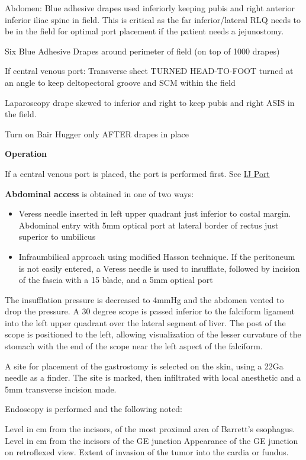 \documentclass[
  letterpaper,
]{scrbook}
\providecommand{\tightlist}{%
  \setlength{\itemsep}{0pt}\setlength{\parskip}{0pt}}
\begin{document}
Abdomen: Blue adhesive drapes used inferiorly keeping pubis and right
anterior inferior iliac spine in field. This is critical as the far
inferior/lateral RLQ needs to be in the field for optimal port placement
if the patient needs a jejunostomy.

Six Blue Adhesive Drapes around perimeter of field (on top of 1000
drapes)

If central venous port: Transverse sheet TURNED HEAD-TO-FOOT turned at
an angle to keep deltopectoral groove and SCM within the field

Laparoscopy drape skewed to inferior and right to keep pubis and right
ASIS in the field.

Turn on Bair Hugger only AFTER drapes in place

\textbf{Operation}

If a central venous port is placed, the port is performed first. See
\hyperref[cv_port_salo]{IJ Port}

\textbf{Abdominal access} is obtained in one of two ways:

\begin{itemize}
\tightlist
\item
  Veress needle inserted in left upper quadrant just inferior to costal
  margin. Abdominal entry with 5mm optical port at lateral border of
  rectus just superior to umbilicus
\item
  Infraumbilical approach using modified Hasson technique. If the
  peritoneum is not easily entered, a Veress needle is used to
  insufflate, followed by incision of the fascia with a 15 blade, and a
  5mm optical port
\end{itemize}

The insufflation pressure is decreased to 4mmHg and the abdomen vented
to drop the pressure. A 30 degree scope is passed inferior to the
falciform ligament into the left upper quadrant over the lateral segment
of liver. The post of the scope is positioned to the left, allowing
visualization of the lesser curvature of the stomach with the end of the
scope near the left aspect of the falciform.

A site for placement of the gastrostomy is selected on the skin, using a
22Ga needle as a finder. The site is marked, then infiltrated with local
anesthetic and a 5mm transverse incision made.

Endoscopy is performed and the following noted:

Level in cm from the incisors, of the most proximal area of Barrett's
esophagus. Level in cm from the incisors of the GE junction Appearance
of the GE junction on retroflexed view. Extent of invasion of the tumor
into the cardia or fundus.
\end{document}

